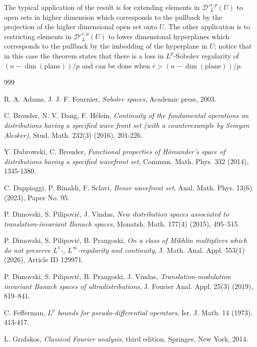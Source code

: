 \documentclass[12pt,reqno]{amsart}
\newcommand{\DD}{\mathcal D}
\theoremstyle{plain}
\theoremstyle{remark}
\theoremstyle{definition}
\numberwithin{equation}{section}
\begin{document}
The typical application of the result is for extending elements in $\DD'^{r,p}_L(U)$ to open sets in higher dimension which corresponds to the pullback by the projection of the higher dimensional open set onto $U$. The other application is to restricting elements in $\DD'^{r,p}_L(U)$ to lower dimensional hyperplanes which corresponds to the pullback by the imbedding of the hyperplane in $U$; notice that in this case the theorem states that there is a loss in $L^p$-Sobolev regularity of $(n-\operatorname{dim}(\mbox{plane}))/p$ and can be done when $r>(n-\operatorname{dim}(\mbox{plane}))/p$.





\begin{thebibliography}{999}

 R. A. Adams, J. J. F. Fournier, \textit{Sobolev spaces}, Academic press, 2003.

 C. Brouder, N. V. Dang, F. H\'elein, \textit{Continuity of the fundamental operations on distributions having a specified wave front set (with a counterexample by Semyon Alesker)}, Stud. Math. 232(3) (2016), 201-226.

 Y. Dabrowski, C. Brouder, \textit{Functional properties of H\"omander’s space of distributions having a specified wavefront set}, Commun. Math. Phys. 332 (2014), 1345-1380.

 C. Dappiaggi, P. Rinaldi, F. Sclavi, \textit{Besov wavefront set}, Anal. Math. Phys. 13(6) (2023), Paper No. 95.

 P. Dimovski, S. Pilipovi\'c, J. Vindas, \textit{New distribution spaces associated to translation-invariant Banach spaces},
Monatsh. Math. 177(4) (2015), 495–515.

 P. Dimovski, S. Pilipovi\'c, B. Prangoski, \textit{On a class of Mikhlin multipliers which do not preserve $L^1$-, $L^{\infty}$-regularity and continuity}, J. Math. Anal. Appl. 553(1) (2026), Article ID 129971.

 P. Dimovski, S. Pilipovi\'c, B. Prangoski, J. Vindas, \textit{Translation-modulation invariant Banach spaces of ultradistributions}, J. Fourier Anal. Appl. 25(3) (2019), 819–841.

 C. Fefferman, \textit{$L^p$ bounds for pseudo-differential operators}, Isr. J. Math. 14 (1973), 413-417.

 L. Grafakos, \emph{Classical Fourier analysis}, third edition, Springer, New York, 2014.


\end{thebibliography}
\end{document}

